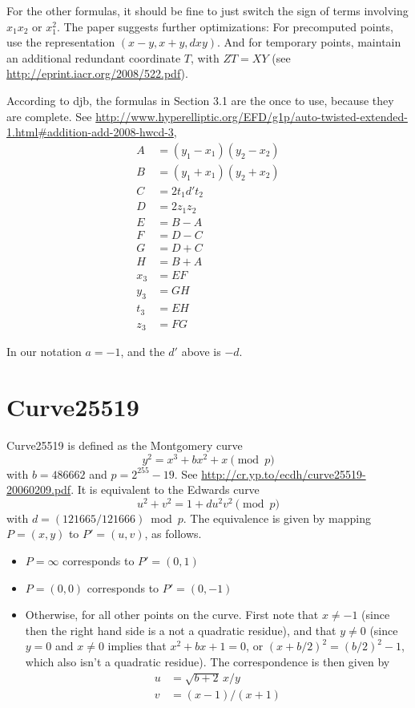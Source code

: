 \documentclass[a4paper]{article}
\begin{document}
For the other formulas, it should be fine to just switch the sign of
terms involving $x_1 x_2$ or $x_1^2$. The paper suggests further
optimizations: For precomputed points, use the representation $(x-y,
x+y, dxy)$. And for temporary points, maintain an additional redundant
coordinate $T$, with $Z T = X Y$ (see
\url{http://eprint.iacr.org/2008/522.pdf}).

According to djb, the formulas in Section 3.1 are the once to use,
because they are complete. See
\url{http://www.hyperelliptic.org/EFD/g1p/auto-twisted-extended-1.html#addition-add-2008-hwcd-3},
\begin{align*}
  A &= (y_1 - x_1)(y_2 - x_2) \\
  B &= (y_1 + x_1)(y_2 + x_2) \\
  C &= 2 t_1 d' t_2 \\
  D &= 2 z_1 z_2 \\
  E &= B - A \\
  F &= D - C \\
  G &= D + C \\
  H &= B + A \\
  x_3 &= E F \\
  y_3 &= G H \\
  t_3 &= E H \\
  z_3 &= F G
\end{align*}

In our notation $a = -1$, and the $d'$ above is $-d$.

\section{Curve25519}

Curve25519 is defined as the Montgomery curve
\begin{equation*}
  y^2 = x^3 + b x^2 + x \pmod p
\end{equation*}
with $b = 486662$ and $p = 2^{255} -19$. See
\url{http://cr.yp.to/ecdh/curve25519-20060209.pdf}. It is equivalent
to the Edwards curve
\begin{equation*}
  u^2 + v^2 = 1 + d u^2 v^2 \pmod p
\end{equation*}
with $d = (121665/121666) \bmod p$. The equivalence is given by
mapping $P = (x,y)$ to $P' = (u, v)$, as follows.
\begin{itemize}
\item $P = \infty$ corresponds to $P' = (0, 1)$
\item $P = (0, 0)$ corresponds to $P' = (0, -1)$
\item Otherwise, for all other points on the curve. First note that $x
  \neq -1$ (since then the right hand side is a not a quadratic
  residue), and that $y \neq 0$ (since $y = 0$ and $x \neq 0$ implies
  that $x^2 + bx + 1 = 0$, or $(x + b/2)^2 = (b/2)^2 - 1$, which also
  isn't a quadratic residue). The correspondence is then given by
  \begin{align*}
    u &= \sqrt{b+2} \, x / y \\
    v &= (x-1) / (x+1)
  \end{align*}
\end{itemize}
\end{document}
